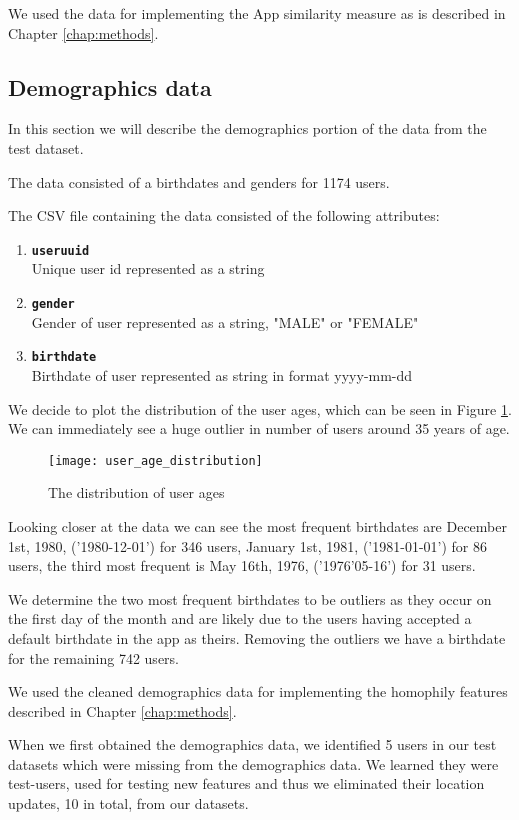 We used the data for implementing the App similarity measure as is described in Chapter \ref{chap:methods}.

\subsection{Demographics data}
In this section we will describe the demographics portion of the data from the test dataset.

The data consisted of a birthdates and genders for 1174 users.

The CSV file containing the data consisted of the following attributes:
\begin{enumerate}
\item \texttt{\textbf{useruuid}}\\Unique user id represented as a string
\item \texttt{\textbf{gender}}\\Gender of user represented as a string, "MALE" or "FEMALE"
\item \texttt{\textbf{birthdate}}\\Birthdate of user represented as string in format yyyy-mm-dd
\end{enumerate}
We decide to plot the distribution of the user ages, which can be seen in Figure \ref{fig:user_age_distribution}. We can immediately see a huge outlier in number of users around 35 years of age.

\begin{figure}[H]
    \hspace*{-1.5cm}
    \centering
    \texttt{[image: user\_age\_distribution]}
    \caption{The distribution of user ages}
    \label{fig:user_age_distribution}
\end{figure}
Looking closer at the data we can see the most frequent birthdates are December 1st, 1980, ('1980-12-01') for 346 users, January 1st, 1981, ('1981-01-01') for 86 users, the third most frequent is May 16th, 1976, ('1976'05-16') for 31 users.

We determine the two most frequent birthdates to be outliers as they occur on the first day of the month and are likely due to the users having accepted a default birthdate in the app as theirs. Removing the outliers we have a birthdate for the remaining 742 users.

We used the cleaned demographics data for implementing the homophily features described in Chapter \ref{chap:methods}.

When we first obtained the demographics data, we identified 5 users in our test datasets which were missing from the demographics data. 
We learned they were test-users, used for testing new features and thus we eliminated their location updates, 10 in total, from our datasets.

